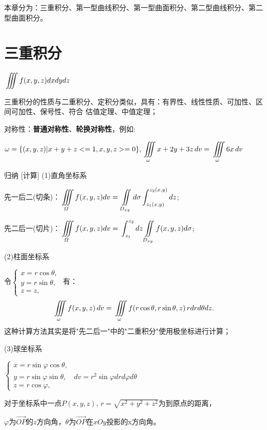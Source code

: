 \documentclass[a4paper,12pt,oneside,fontset=none]{ctexbook}
\let\oldint\int
\renewcommand{\int}{\displaystyle{\vrule width 0pt height 0em depth 0em}\oldint}
\let\oldiint\iint
\renewcommand{\iint}{\displaystyle{\vrule width 0pt height 0em depth 0em}\oldiint}
\let\oldiiint\iiint
\renewcommand{\iiint}{\displaystyle{\vrule width 0pt height 0em depth 0em}\oldiiint}
\newenvironment{induction}[1][]{\begin{thmBox}{归纳}{#1}}{\end{thmBox}}
\numberwithin{equation}{chapter}
\begin{document}
本章分为：三重积分、第一型曲线积分、第一型曲面积分、第二型曲线积分、第二型曲面积分。

\section{三重积分}
$ \iiint f(x,y,z)dx dy dz$ 

三重积分的性质与二重积分、定积分类似，具有：有界性、线性性质、可加性、区间可加性、保号性、符合 估值定理、中值定理；

对称性：\textbf{普通对称性}、\textbf{轮换对称性}，例如:

$\omega = \{ (x,y,z)|x+y+z<=1, x,y,z>=0 \}, \iiint\limits_{\omega} x + 2y + 3z \, dv = \iiint\limits_{\omega}6x \, dv$

\begin{induction}
    [计算]
    (1)直角坐标系

    先一后二(切条)：$\iiint\limits_{\varOmega } f(x,y,z)dv = \iint\limits_{D_{xy}} d\sigma \int_{z_1(x,y)}^{z_2(x,y)} dz$;

    先二后一(切片)：$\iiint\limits_{\varOmega } f(x,y,z)dv = \int_{z_1}^{z_2} dz \iint\limits_{D_{xy}} f(x,y,z) d\sigma$;
    
    (2)柱面坐标系

    令$\begin{cases}
        x = r \cos \theta,\\
        y = r \sin \theta,\\
        z = z,
    \end{cases}$
    有：
    $$\iiint\limits_{\omega} f(x,y,z)\, dv = \iiint\limits_{\omega} f(r \cos \theta,r \sin \theta,z)\, r drd\theta dz.$$
    这种计算方法其实是将"先二后一"中的"二重积分"使用极坐标进行计算；

    (3)球坐标系
    
    $\begin{cases}
        x = r \sin \varphi \cos \theta,\\
        y = r \sin \varphi \sin \theta,\quad dv = r^2 \sin \varphi dr d\varphi d\theta \\
        z = r \cos \varphi,
    \end{cases}$
    
    对于坐标系中一点$P(x,y,z)$, $r = \sqrt{x^2+y^2+z^2}$为到原点的距离，
    
    $\varphi$为$\overrightarrow{OP}$的$z$方向角，$\theta$为$\overrightarrow{OP}$在$xOy$投影的x方向角。


\end{induction}
\end{document}
